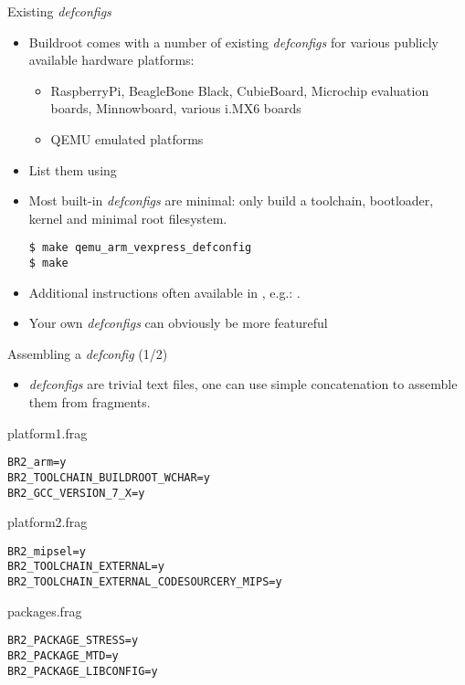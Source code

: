 \begin{frame}[fragile]{Existing {\em defconfigs}}

  \begin{itemize}

  \item Buildroot comes with a number of existing {\em defconfigs} for
    various publicly available hardware platforms:
    \begin{itemize}
    \item RaspberryPi, BeagleBone Black, CubieBoard, Microchip evaluation
      boards, Minnowboard, various i.MX6 boards
    \item QEMU emulated platforms
    \end{itemize}
  \item List them using 
  \item Most built-in {\em defconfigs} are minimal: only build a
    toolchain, bootloader, kernel and minimal root filesystem.
    \begin{block}{}
\begin{verbatim}
$ make qemu_arm_vexpress_defconfig
$ make
\end{verbatim}
\end{block}

\item Additional instructions often available in
  , e.g.: .
\item Your own {\em defconfigs} can obviously be more featureful
  \end{itemize}
\end{frame}

\begin{frame}[fragile]{Assembling a {\em defconfig} (1/2)}

  \begin{itemize}
  \item {\em defconfigs} are trivial text files, one can use simple
    concatenation to assemble them from fragments.
  \end{itemize}

{\small
   \begin{block}{platform1.frag}
\begin{verbatim}
BR2_arm=y
BR2_TOOLCHAIN_BUILDROOT_WCHAR=y
BR2_GCC_VERSION_7_X=y
\end{verbatim}
   \end{block}
}

{\small
    \begin{block}{platform2.frag}
\begin{verbatim}
BR2_mipsel=y
BR2_TOOLCHAIN_EXTERNAL=y
BR2_TOOLCHAIN_EXTERNAL_CODESOURCERY_MIPS=y
\end{verbatim}
    \end{block}
}

{\small
   \begin{block}{packages.frag}
\begin{verbatim}
BR2_PACKAGE_STRESS=y
BR2_PACKAGE_MTD=y
BR2_PACKAGE_LIBCONFIG=y
\end{verbatim}
   \end{block}
}

\end{frame}

